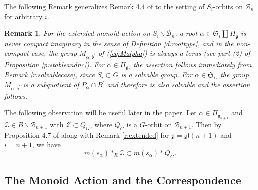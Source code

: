 \documentclass[12pt]{amsart}
\numberwithin{equation}{section}
\newtheorem{rem}[thm]{Remark}
\newcommand{\cZ}{{\mathcal Z}}
\newcommand{\fg}{\mbox{${\mathfrak g}$}}
\newcommand{\fb}{\mbox{${\mathfrak b}$}}
\newcommand{\fgl}{\mathfrak{gl}}
\newcommand{\B}{\mathcal{B}}
\newcommand{\ms}{m(s_{\alpha})}
\begin{document}
The following Remark generalizes Remark 4.4 of \cite{Shpairs} to the setting of $S_{i}$-orbits on $\B_{n}$ for arbitrary $i$. 
\begin{rem}\label{r:onlythree}
For the extended monoid action on $S_{i}\backslash\B_{n}$, a root $\alpha\in\mathfrak{S}_{i}\coprod \Pi_{\fg}$ is never compact imaginary in the sense of Definition \ref{d:roottype}, and in the non-compact case, the group $M_{\alpha,\fb^{\prime}}$ of (\ref{eq:Malpha}) is always a torus (see part (2) of Proposition \ref{p:stableandnc}).  For $\alpha\in \Pi_{\fg}$, the assertion follows immediately from Remark \ref{r:solvablecase}, since $S_{i}\subset G$ is a solvable group.  For $\alpha\in\mathfrak{S}_{i}$, the group $M_{\alpha, \fb^{\prime}}$ is a subquotient of $P_{\alpha}\cap B^{\prime}$ and therefore is also solvable and the assertion follows. 
\end{rem}

The following observation will be useful later in the paper.  Let $\alpha\in\Pi_{\fg_{n+1}}$ and $\cZ \in B\backslash\B_{n+1}$ with $\cZ\subset Q_{G}$, where $Q_{G}$ is a $G$-orbit on $\B_{n+1}$. Then by Proposition 4.7 of \cite{CE21I} along with Remark \ref{r:extended} for $\fg=\fgl(n+1)$ and $i=n+1$, we have 
\begin{equation}\label{p:old4.7}
 \ms*_{R}\cZ\subset \ms*Q_{G}.
\end{equation}  


\subsection{The Monoid Action and the Correspondence}\label{ss:monoidcorresp}
\end{document}
